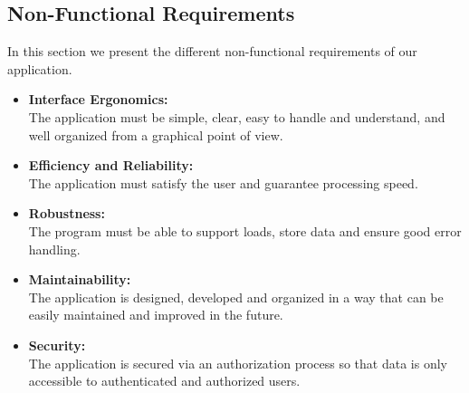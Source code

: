 \subsection{Non-Functional Requirements}
In this section we present the different non-functional requirements of our application.

\vspace{0.5cm}

\begin{itemize}
\item \textbf{Interface Ergonomics:} \\
The application must be simple, clear, easy to handle and understand, and well organized from a graphical point of view.

\vspace{0.5cm}

\item \textbf{Efficiency and Reliability:} \\
The application must satisfy the user and guarantee processing speed.

\vspace{0.5cm}

\item \textbf{Robustness:} \\
The program must be able to support loads, store data and ensure good error handling.

\vspace{0.5cm}

\item \textbf{Maintainability:} \\
The application is designed, developed and organized in a way that can be easily maintained and improved in the future.

\vspace{0.5cm}

\item \textbf{Security:} \\
The application is secured via an authorization process so that data is only accessible to authenticated and authorized users.
\end{itemize}

